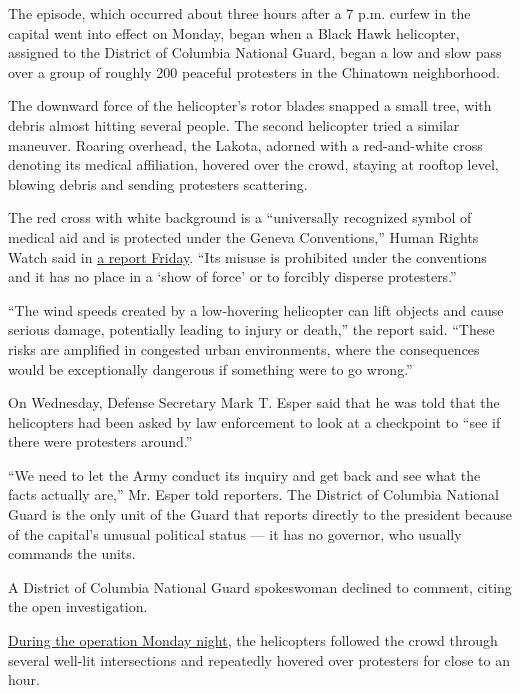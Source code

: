 The episode, which occurred about three hours after a 7 p.m. curfew in
the capital went into effect on Monday, began when a Black Hawk
helicopter, assigned to the District of Columbia National Guard, began a
low and slow pass over a group of roughly 200 peaceful protesters in the
Chinatown neighborhood.

The downward force of the helicopter's rotor blades snapped a small
tree, with debris almost hitting several people. The second helicopter
tried a similar maneuver. Roaring overhead, the Lakota, adorned with a
red-and-white cross denoting its medical affiliation, hovered over the
crowd, staying at rooftop level, blowing debris and sending protesters
scattering.

The red cross with white background is a ``universally recognized symbol
of medical aid and is protected under the Geneva Conventions,'' Human
Rights Watch said in
\href{https://www.hrw.org/news/2020/06/05/reckless-use-us-helicopters-intimidate-protesters}{a
report Friday}. ``Its misuse is prohibited under the conventions and it
has no place in a `show of force' or to forcibly disperse protesters.''

``The wind speeds created by a low-hovering helicopter can lift objects
and cause serious damage, potentially leading to injury or death,'' the
report said. ``These risks are amplified in congested urban
environments, where the consequences would be exceptionally dangerous if
something were to go wrong.''

On Wednesday, Defense Secretary Mark T. Esper said that he was told that
the helicopters had been asked by law enforcement to look at a
checkpoint to ``see if there were protesters around.''

``We need to let the Army conduct its inquiry and get back and see what
the facts actually are,'' Mr. Esper told reporters. The District of
Columbia National Guard is the only unit of the Guard that reports
directly to the president because of the capital's unusual political
status --- it has no governor, who usually commands the units.

A District of Columbia National Guard spokeswoman declined to comment,
citing the open investigation.

\href{https://www.nytimes.com/2020/06/02/us/politics/military-national-guard-trump-protests.html}{During
the operation Monday night}, the helicopters followed the crowd through
several well-lit intersections and repeatedly hovered over protesters
for close to an hour.

